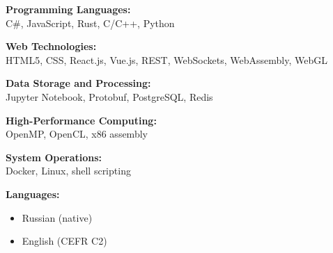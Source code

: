 \vspace{1.2mm}

\small{\textbf{Programming Languages:}}\\[2mm]
C\#, JavaScript, Rust, C/C++, Python

\divider

\small{\textbf{Web Technologies:}}\\[2mm]
HTML5, CSS, React.js, Vue.js, REST, WebSockets,
WebAssembly, WebGL

\divider

\small{\textbf{Data Storage and Processing:}}\\[2mm]
Jupyter Notebook, Protobuf, PostgreSQL, Redis

\divider

\small{\textbf{High-Performance Computing:}}\\[2mm]
OpenMP, OpenCL, x86 assembly

\divider

\small{\textbf{System Operations:}}\\[2mm]
Docker, Linux, shell scripting

\medskip

\small{\textbf{Languages:}}\\[2mm]
\begin{itemize}
  \item Russian (native)
  \item English (CEFR C2)
\end{itemize}

\medskip

\\[2mm]
\\[2mm]
